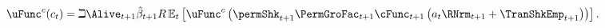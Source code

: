   \begin{equation}\begin{gathered}\begin{aligned}
        \uFunc^{c}(c_{\prd}) & = \beth\Alive_{\prd+1}\hat{\DiscFac}_{\prd+1}\Rfree \Ex_{\prd}\left[\uFunc^{c}\left(\permShk_{\prd+1}\PermGroFac_{\prd+1}\cFunc_{\prd+1}\left(a_{\prd}\RNrm_{\prd+1}+\TranShkEmp_{\prd+1}\right)\right)\right]\label{eq:FOCLifeCycle}
        .
      \end{aligned}\end{gathered}\end{equation}
